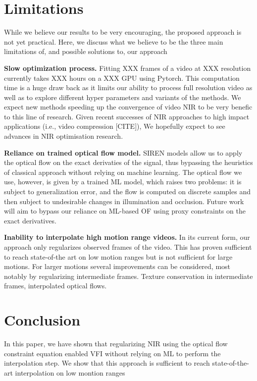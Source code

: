\documentclass{article}
\begin{document}
\section{Limitations}

While we believe our results to be very encouraging, the proposed approach is not yet practical.
Here, we discuss what we believe to be the three main limitations of, and possible solutions to, our approach

\textbf{Slow optimization process.} Fitting XXX frames of a video at XXX resolution currently takes XXX hours on a XXX GPU using Pytorch.
This computation time is a huge draw back as it limits our ability to process full resolution video as well as 
to explore different hyper parameters and variants of the methods.
We expect new methods speeding up the convergence of video NIR to be very benefic to this line of research.
Given recent successes of NIR approaches to high impact applications (i.e., video compression [CITE]),
We hopefully expect to see advances in NIR optimisation research.

\textbf{Reliance on trained optical flow model.}
SIREN models allow us to apply the optical flow on the exact derivaties of the signal,
thus bypassing the heuristics of classical approach without relying on machine learning.
The optical flow we use, however, is given by a trained ML model, which raises two problems: 
it is subject to generalization error, and the flow is computed on discrete samples and then subject to 
undesirable changes in illumination and occlusion.
Future work will aim to bypass our reliance on ML-based OF using proxy constraints on the exact derivatives.

\textbf{Inability to interpolate high motion range videos.} 
In its current form, our approach only regularizes observed frames of the video.
This has proven sufficient to reach state-of-the art on low motion ranges but is not sufficient for large motions.
For larger motions several improvements can be considered, most notably by regularizing intermediate frames.
Texture conservation in intermediate frames, interpolated optical flows. 

\section{Conclusion}

In this paper, we have shown that regularizing NIR using the optical flow constraint equation 
enabled VFI without relying on ML to perform the interpolation step.
We show that this approach is sufficient to reach state-of-the-art interpolation 
on low montion ranges 
\end{document}
